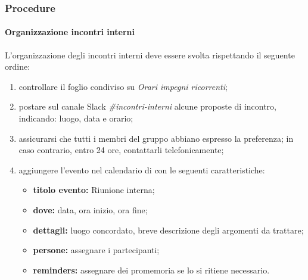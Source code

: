        \subsubsection{Procedure}
	        \paragraph{Organizzazione incontri interni}
	        \label{sec:incontri_interni}
	        L'organizzazione degli incontri interni deve essere svolta rispettando il seguente ordine:
	        \begin{enumerate}
	        	\item controllare il foglio condiviso su  \textit{Orari impegni ricorrenti};
	        	\item postare sul canale Slack \textit{\#incontri-interni} alcune proposte di incontro, indicando: luogo, data e orario;
	        	\item assicurarsi che tutti i membri del gruppo abbiano espresso la preferenza; in caso contrario, entro 24 ore, contattarli telefonicamente;
	        	\item aggiungere l'evento nel calendario di  con le seguenti caratteristiche:
	        	\begin{itemize}
	        		\item \textbf{titolo evento:} Riunione interna;
	        		\item \textbf{dove:} data, ora inizio, ora fine;
	        		\item \textbf{dettagli:} luogo concordato, breve descrizione degli argomenti da trattare;
	        		\item \textbf{persone:} assegnare i partecipanti;
	        		\item \textbf{reminders:} assegnare dei promemoria se lo si ritiene necessario.
	        	\end{itemize}
	        \end{enumerate}
